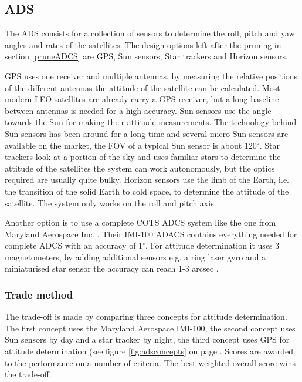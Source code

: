 \subsection{\ac{ADS}}
\label{ss:ads}
The \ac{ADS} consists for a collection of sensors to determine the roll, pitch and yaw angles and rates of the satellites. The design options left after the pruning in section \ref{pruneADCS} are \ac{GPS}, Sun sensors, Star trackers and Horizon sensors. 

\ac{GPS} uses one receiver and multiple antennas, by measuring the relative positions of the different antennas the attitude of the satellite can be calculated. Most modern \ac{LEO} satellites are already carry a \ac{GPS} receiver, but a long baseline between antennas is needed for a high accuracy. 
Sun sensors use the angle towards the Sun for making their attitude measurements. The technology behind Sun sensors has been around for a long time and several micro Sun sensors are available on the market, the \ac{FOV} of a typical Sun sensor is about 120${}^{\circ}$. 
Star trackers look at a portion of the sky and uses familiar stars to determine the attitude of the satellites the system can work autonomously, but the optics required are usually quite bulky. 
Horizon sensors use the limb of the Earth, i.e. the transition of the solid Earth to cold space, to determine the attitude of the satellite. The system only works on the roll and pitch axis.

Another option is to use a complete \ac{COTS} \ac{ADCS} system like the one from Maryland Aerospace Inc. \cite{maryland}. Their IMI-100 ADACS contains everything needed for complete \ac{ADCS} with an accuracy of 1${}^\circ$. For attitude determination it uses 3 magnetometers, by adding additional sensors e.g. a ring laser gyro and a miniaturised star sensor the accuracy can reach 1-3 arcsec \cite{imi100}.

\subsubsection{Trade method}
The trade-off is made by comparing three concepts for attitude determination. The first concept uses the Maryland Aerospace IMI-100, the second concept uses Sun sensors by day and a star tracker by night, the third concept uses \ac{GPS} for attitude determination (see figure \ref{fig:adsconcepts} on page \pageref{fig:adsconcepts}. Scores are awarded to the performance on a number of criteria. The best weighted overall score wins the trade-off.

